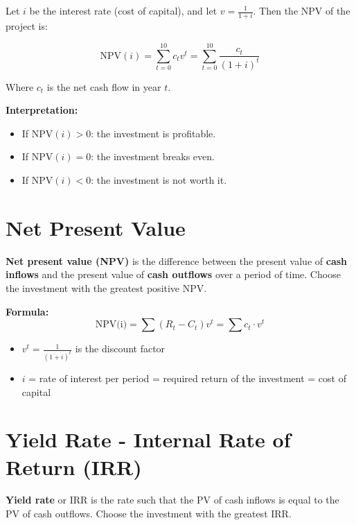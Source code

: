 \begin{example}
Let \( i \) be the interest rate (cost of capital), and let \( v = \frac{1}{1 + i} \). Then the NPV of the project is:

\[
\text{NPV}(i) = \sum_{t=0}^{10} c_t v^t = \sum_{t=0}^{10} \frac{c_t}{(1+i)^t}
\]

Where \( c_t \) is the net cash flow in year \( t \).

\textbf{Interpretation:}
\begin{itemize}
    \item If \( \text{NPV}(i) > 0 \): the investment is profitable.
    \item If \( \text{NPV}(i) = 0 \): the investment breaks even.
    \item If \( \text{NPV}(i) < 0 \): the investment is not worth it.
\end{itemize}
\end{example}






\section{Net Present Value}

\begin{definition}
\textbf{Net present value (NPV)} is the difference between the present value of \textbf{cash inflows} and the present value of \textbf{cash outflows} over a period of time. Choose the investment with the greatest positive NPV.
\end{definition}

\begin{comment}
Goal: Measure whether a project is profitable. 
\end{comment}

\textbf{Formula:}
\[
\text{NPV(i)} = \sum (R_t - C_t) v^t = \sum c_t\cdot v^t
\]


\begin{itemize}
    \item $v^t = \frac{1}{(1+i)^t}$ is the discount factor
    \item $i$ = rate of interest per period = required return of the investment = cost of capital
\end{itemize}

\section{Yield Rate - Internal Rate of Return (IRR)}

\begin{definition}
    \textbf{Yield rate} or IRR is the rate such that the PV of cash inflows is equal to the PV of cash outflows. Choose the investment with the greatest IRR.
\end{definition}

